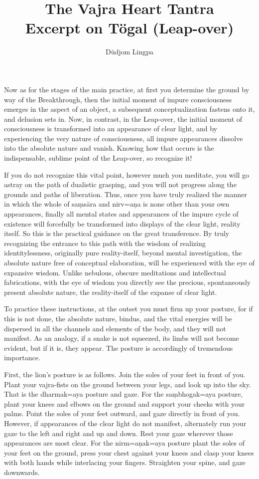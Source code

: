 \documentclass[11pt,twocolumn]{article}
\title{The Vajra Heart Tantra\\
Excerpt on T\"ogal (Leap-over)}
\author{D\"udjom Lingpa}
\begin{document}
\maketitle

Now as for the stages of the main practice, at first you determine the
ground by way of the Breakthrough, then the initial moment of impure
consciousness emerges in the aspect of an object, a subsequent
conceptualization fastens onto it, and delusion sets in. Now, in
contrast, in the Leap\hyp{}over, the initial moment of consciousness is
transformed into an appearance of clear light, and by experiencing the
very nature of consciousness, all impure appearances dissolve into the
absolute nature and vanish. Knowing how that occurs is the
indispensable, sublime point of the Leap\hyp{}over, so recognize it!

If you do not recognize this vital point, however much you meditate,
you will go astray on the path of dualistic grasping, and you will not
progress along the grounds and paths of liberation. Thus, once you
have truly realized the manner in which the whole of sa\d{m}s\={a}ra
and nirv\a={a}\d{n}a is none other than your own appearances, finally
all mental states and appearances of the impure cycle of existence
will forcefully be transformed into displays of the clear light,
reality itself. So this is the practical guidance on the great
transference. By truly recognizing the entrance to this path with the
wisdom of realizing identitylessness, originally pure
reality\hyp{}itself, beyond mental investigation, the absolute nature
free of conceptual elaboration, will be experienced with the eye of
expansive wisdom. Unlike nebulous, obscure meditations and
intellectual fabrications, with the eye of wisdom you directly see the
precious, spontaneously present absolute nature, the
reality\hyp{}itself of the expanse of clear light.

To practice these instructions, at the outset you must firm up your
posture, for if this is not done, the absolute nature, bindus, and the
vital energies will be dispersed in all the channels and elements of
the body, and they will not manifest. As an analogy, if a snake is not
squeezed, its limbs will not become evident, but if it is, they
appear. The posture is accordingly of tremendous importance.

First, the lion's posture is as follows. Join the soles of your feet
in front of you. Plant your vajra\hyp{}fists on the ground between
your legs, and look up into the sky. That is the dharmak\a={a}ya
posture and gaze. For the sa\d{m}bhogak\a={a}ya posture, plant your
knees and elbows on the ground and support your cheeks with your
palms. Point the soles of your feet outward, and gaze directly in
front of you. However, if appearances of the clear light do not
manifest, alternately run your gaze to the left and right and up and
down. Rest your gaze wherever those appearances are most clear. For
the nirm\a={a}\d{n}ak\a={a}ya posture plant the soles of your feet on
the ground, press your chest against your knees and clasp your knees
with both hands while interlacing your fingers. Straighten your spine,
and gaze downwards.
\end{document}
